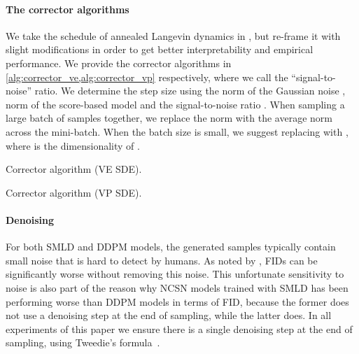 \documentclass{article} \usepackage{iclr2021_conference,times}
\begin{document}
\paragraph{The corrector algorithms} We take the schedule of annealed Langevin dynamics in \citet{song2019generative}, but re-frame it with slight modifications in order to get better interpretability and empirical performance. We provide the corrector algorithms in \cref{alg:corrector_ve,alg:corrector_vp} respectively, where we call  the ``signal-to-noise'' ratio. We determine the step size  using the norm of the Gaussian noise , norm of the score-based model  and the signal-to-noise ratio . When sampling a large batch of samples together, we replace the norm  with the average norm across the mini-batch. When the batch size is small, we suggest replacing  with , where  is the dimensionality of . 



\begin{minipage}[t]{0.49\linewidth}
\begin{algorithm}[H]
	\caption{Corrector algorithm (VE SDE).}
	\label{alg:corrector_ve}
	\begin{algorithmic}[1]
	    \State{}
                \State{}
                \State{}
                \State{}
                \State{}
            \EndFor
            \State{}
        \EndFor
        \item[]
        \Return{}
	\end{algorithmic}
\end{algorithm}
\end{minipage}
\begin{minipage}[t]{0.49\linewidth}
\begin{algorithm}[H]
	\caption{Corrector algorithm (VP SDE).}
	\label{alg:corrector_vp}
	\begin{algorithmic}[1]
	    \State{}
                \State{}
                \State{}
                \State{}
                \State{}
            \EndFor
            \State{}
        \EndFor
        \item[]
        \Return{}
	\end{algorithmic}
\end{algorithm}
\end{minipage}


\paragraph{Denoising} For both SMLD and DDPM models, the generated samples typically contain small noise that is hard to detect by humans. As noted by \citet{jolicoeur2020adversarial}, FIDs can be significantly worse without removing this noise. This unfortunate sensitivity to noise is also part of the reason why NCSN models trained with SMLD has been performing worse than DDPM models in terms of FID, because the former does not use a denoising step at the end of sampling, while the latter does. In all experiments of this paper we ensure there is a single denoising step at the end of sampling, using Tweedie's formula~\citep{efron2011tweedie}.
\end{document}
